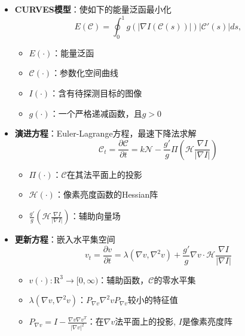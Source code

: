 \begin{frame}
\begin{itemize}
\item \textbf{CURVES模型}：使如下的能量泛函最小化
\begin{equation*}
E(\mathcal C) = \oint_0^1 g\left( \left| \nabla I \left( \mathcal{C} \left(  s \right) \right) \right| \right) \left| \mathcal{C}'\left( s \right) \right| ds,
\end{equation*}
\begin{itemize}
\item $E(\cdot)$：能量泛函
\item $\mathcal{C}(\cdot)$：参数化空间曲线
\item $I(\cdot)$：含有待探测目标的图像
\item $g(\cdot)$：一个严格递减函数，且$g > 0$
\end{itemize}
\end{itemize}
\end{frame}

\begin{frame}
\begin{itemize}
\item \textbf{演进方程}：Euler-Lagrange方程，最速下降法求解
\begin{equation*}
\mathcal{C}_t = \frac{\partial \mathcal{C}}{\partial t} = k \mathcal{N} - \frac{g'}{g} \varPi \left( \mathcal{H} \frac{\nabla I}{\left| \nabla I \right|} \right)
\end{equation*}
\begin{itemize}
\item $\varPi(\cdot)$：$\mathcal{C}$在其法平面上的投影
\item $\mathcal{H}(\cdot)$：像素亮度函数的Hessian阵
\item $\frac{g'}{g} \left( \mathcal{H} \frac{\nabla I}{\left| \nabla I \right|} \right)$：辅助向量场
\end{itemize}
\end{itemize}
\end{frame}

\begin{frame}
\begin{itemize}
\item \textbf{更新方程}：嵌入水平集空间
\begin{equation*}
v_t = \frac{\partial v}{\partial t} = \lambda \left( \nabla v, \nabla^2 v \right) + \frac{g'}{g} \nabla v \cdot \mathcal{H} \frac{\nabla I}{ \left| \nabla I \right| }
\end{equation*}
\begin{itemize}
\item $v(\cdot): \mathrm{R}^3 \rightarrow [0, \infty)$：辅助函数，$\mathcal{C}$的零水平集
\item $\lambda \left( \nabla v, \nabla^2 v \right)$：$P_{\nabla v} \nabla^{2} v P_{\nabla v}$较小的特征值
\item $P_{\nabla v} = I - \frac{\nabla v \nabla v^{T}}{\left| \nabla v \right|^{2}}$：在$\nabla v$法平面上的投影, $I$是像素亮度阵
\end{itemize}
\end{itemize}
\end{frame}

